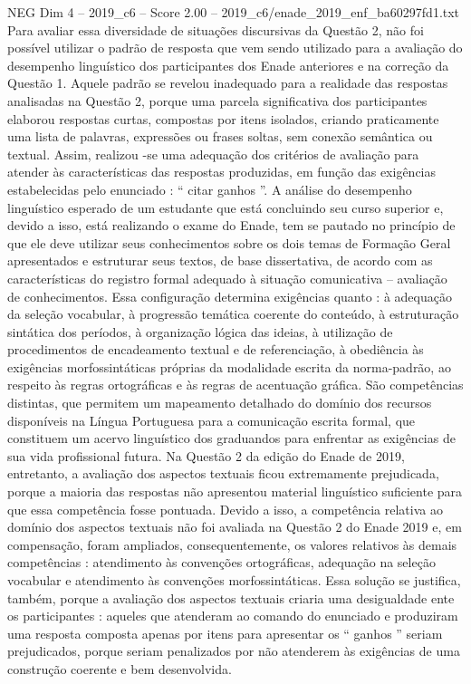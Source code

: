 \begin{textsample}{NEG Dim 4 – 2019\_c6 – Score 2.00 – 2019\_c6/enade\_2019\_enf\_ba60297fd1.txt}
Para avaliar essa diversidade de situações discursivas da Questão 2, não foi possível utilizar o padrão de resposta que vem sendo utilizado para a avaliação do desempenho linguístico dos participantes dos Enade anteriores e na correção da Questão 1.
Aquele padrão se revelou inadequado para a realidade das respostas analisadas na Questão 2, porque uma parcela significativa dos participantes elaborou respostas curtas, compostas por itens isolados, criando praticamente uma lista de palavras, expressões ou frases soltas, sem conexão semântica ou textual.
Assim, realizou -se uma adequação dos critérios de avaliação para atender às características das respostas produzidas, em função das exigências estabelecidas pelo enunciado : “ citar ganhos ”.
A análise do desempenho linguístico esperado de um estudante que está concluindo seu curso superior e, devido a isso, está realizando o exame do Enade, tem se pautado no princípio de que ele deve utilizar seus conhecimentos sobre os dois temas de Formação Geral apresentados e estruturar seus textos, de base dissertativa, de acordo com as características do registro formal adequado à situação comunicativa – avaliação de conhecimentos.
Essa configuração determina exigências quanto : à adequação da seleção vocabular, à progressão temática coerente do conteúdo, à estruturação sintática dos períodos, à organização lógica das ideias, à utilização de procedimentos de encadeamento textual e de referenciação, à obediência às exigências morfossintáticas próprias da modalidade escrita da norma-padrão, ao respeito às regras ortográficas e às regras de acentuação gráfica.
São competências distintas, que permitem um mapeamento detalhado do domínio dos recursos disponíveis na Língua Portuguesa para a comunicação escrita formal, que constituem um acervo linguístico dos graduandos para enfrentar as exigências de sua vida profissional futura.
Na Questão 2 da edição do Enade de 2019, entretanto, a avaliação dos aspectos textuais ficou extremamente prejudicada, porque a maioria das respostas não apresentou material linguístico suficiente para que essa competência fosse pontuada.
Devido a isso, a competência relativa ao domínio dos aspectos textuais não foi avaliada na Questão 2 do Enade 2019 e, em compensação, foram ampliados, consequentemente, os valores relativos às demais competências : atendimento às convenções ortográficas, adequação na seleção vocabular e atendimento às convenções morfossintáticas.
Essa solução se justifica, também, porque a avaliação dos aspectos textuais criaria uma desigualdade ente os participantes : aqueles que atenderam ao comando do enunciado e produziram uma resposta composta apenas por itens para apresentar os “ ganhos ” seriam prejudicados, porque seriam penalizados por não atenderem às exigências de uma construção coerente e bem desenvolvida.

\end{textsample}
